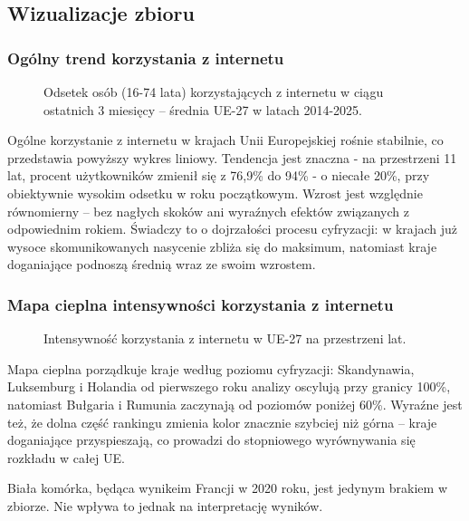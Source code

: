 \documentclass[12pt]{article}
\begin{document}
\newpage
\subsection{Wizualizacje zbioru}

\subsubsection{Ogólny trend korzystania z internetu}

\begin{figure}[H]
    
    \caption{Odsetek osób (16-74 lata) korzystających z internetu w ciągu ostatnich 3 miesięcy – średnia UE-27 w latach 2014-2025.}
\end{figure}

Ogólne korzystanie z internetu w krajach Unii Europejskiej rośnie stabilnie, co przedstawia powyższy wykres liniowy. 
Tendencja jest znaczna - na przestrzeni 11 lat, procent użytkowników zmienił się z 76,9\% do 94\% - o niecałe 20\%, przy obiektywnie 
wysokim odsetku w roku początkowym. Wzrost jest względnie równomierny – bez nagłych skoków ani wyraźnych efektów związanych z odpowiednim rokiem.
Świadczy to o dojrzałości procesu cyfryzacji: w krajach już wysoce skomunikowanych nasycenie zbliża się do maksimum, natomiast kraje
doganiające podnoszą średnią wraz ze swoim wzrostem.




\subsubsection{Mapa cieplna intensywności korzystania z internetu}

\begin{figure}[H]
    
    \caption{Intensywność korzystania z internetu w UE-27 na przestrzeni lat.}
\end{figure}

Mapa cieplna porządkuje kraje według poziomu cyfryzacji: Skandynawia, Luksemburg i Holandia od pierwszego roku analizy oscylują przy granicy 100\%, 
natomiast Bułgaria i Rumunia zaczynają od poziomów poniżej 60\%. Wyraźne jest też, że dolna część rankingu zmienia kolor znacznie szybciej niż górna 
– kraje doganiające przyspieszają, co prowadzi do stopniowego wyrównywania się rozkładu w całej UE. 

Biała komórka, będąca wynikeim Francji w 2020 roku, jest jedynym brakiem w zbiorze. Nie wpływa to jednak na interpretację wyników.
\end{document}
